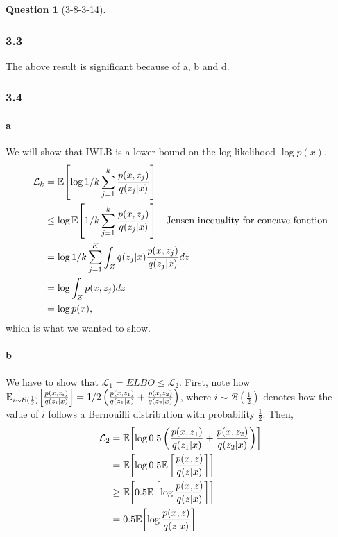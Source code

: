 \documentclass[12pt]{article}
\theoremstyle{definition}
\newtheorem{exercise}{Question}%
\begin{document}
\begin{exercise}[3-8-3-14]
{  \subsubsection*{3.3}
  The above result is significant because of a, b and d.
  \subsubsection*{3.4}
  \paragraph{a}
  We will show that IWLB is a lower bound on the log likelihood $\log p(x)$.
  \begin{align*}
    \mathcal{L}_{k} &= \mathbb{E}{\left[ \log 1/k \sum_{j =  1}^{k} \frac{p(x, z_{j})}{q(z_{j}|x)} \right]}\\
        & \leq  \log \mathbb{E}{\left[  1/k \sum_{j =  1}^{k} \frac{p(x, z_{j})}{q(z_{j}|x)} \right]} \quad \text{Jensen
          inequality for concave fonction}\\
        & = \log 1/k \sum_{j = 1}^{K} \int_{Z} q(z_{j}|x) \frac{p(x, z_{j})}{q(z_{j}|x)} dz\\
        & = \log \int_{Z} p(x,z_{j}) dz \\
        & = \log p(x),
  \end{align*}
  which is what we wanted to show.
  \paragraph{b}
  We have to show that $\mathcal{L}_{1} = ELBO \leq \mathcal{L}_{2}$. First, note how
  $\mathbb{E}_{i\sim \mathcal{B}(\frac{1}{2})}{\left[ \frac{p(x,z_{i})}{q(z_{i}|x)} \right]} = 1/2 \left( \frac{p(x,z_{1})}{q(z_{1}|x)}+ \frac{p(x,z_{2})}{q(z_{2}|x)} \right)$,
  where $i \sim \mathcal{B}(\frac{1}{2})$ denotes how the value of $i$ follows a Bernouilli
  distribution with probability $\frac{1}{2}$. Then,
  \begin{align*}
    \mathcal{L}_{2} &= \mathbb{E}{\left[ \log 0.5 \left( \frac{p(x, z_{1})}{q(z_{1}|x)} + \frac{p(x, z_{2})}{q(z_{2}|x)} \right) \right]}\\
                    &= \mathbb{E}{\left[ \log 0.5 \mathbb{E}\,{\left[ \frac{p(x, z)}{q(z|x)} \right]} \right]}\\
                    &\geq \mathbb{E}{\left[  0.5 \mathbb{E}\,{\left[ \log \frac{p(x, z)}{q(z|x)} \right]} \right]}\\
                    &= 0.5 \mathbb{E}{\left[ \log \frac{p(x,z)}{q(z|x)} \right]}
  \end{align*}


}
\end{exercise}
\end{document}
